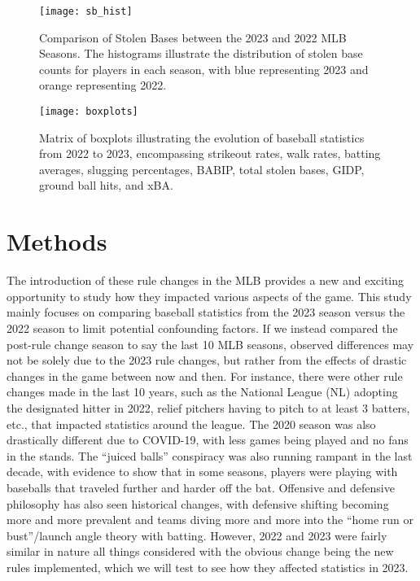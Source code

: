 \documentclass[12pt]{article}
\begin{document}
\begin{figure}[tbp]
  \centering
  \texttt{[image: sb\_hist]}
  \caption{Comparison of Stolen Bases between the 2023 and 2022 MLB Seasons. The
  histograms illustrate the distribution of stolen base counts for players in each
  season, with blue representing 2023 and orange representing 2022.}
  \label{fig:Fig2}
\end{figure}

\begin{figure}[tbp]
  \centering
  \texttt{[image: boxplots]}
  \caption{Matrix of boxplots illustrating the evolution of baseball statistics
  from 2022 to 2023, encompassing strikeout rates, walk rates, batting averages,
  slugging percentages, BABIP, total stolen bases, GIDP, ground ball hits, and xBA.}
  \label{fig:Fig3}
\end{figure}


\section{Methods}
\label{sec:meth}

The introduction of these rule changes in the MLB provides a new and exciting
opportunity to study how they impacted various aspects of the game. This study
mainly focuses on comparing baseball statistics from the 2023 season versus the
2022 season to limit potential confounding factors. If we instead compared the
post-rule change season to say the last 10 MLB seasons, observed differences
may not be solely due to the 2023 rule changes, but rather from the effects of
drastic changes in the game between now and then. For instance, there were other
rule changes made in the last 10 years, such as the National League (NL) adopting
the designated hitter in 2022, relief pitchers having to pitch to at least 3 batters,
etc., that impacted statistics around the league. The 2020 season was also
drastically different due to COVID-19, with less games being played and no fans in
the stands. The ``juiced balls'' conspiracy was also running rampant in the last
decade, with evidence to show that in some seasons, players were playing with
baseballs that traveled further and harder off the bat. Offensive and defensive
philosophy has also seen historical changes, with defensive shifting becoming
more and more prevalent and teams diving more and more into the ``home run or
bust''/launch angle theory with batting. However, 2022 and 2023 were fairly similar
in nature all things considered with the obvious change being the new rules implemented,
which we will test to see how they affected statistics in 2023.
\end{document}
